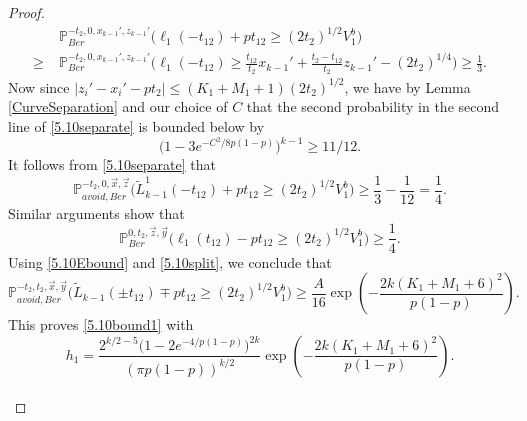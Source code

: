 \begin{proof}
\begin{equation}
\begin{split}
	&\mathbb{P}^{-t_2,0,x_{k-1}',z_{k-1}'}_{Ber}\Big(\ell_1(-t_{12}) + pt_{12} \geq (2t_2)^{1/2}V_1^b\Big)\\
	\geq \; & \mathbb{P}^{-t_2,0,x_{k-1}',z_{k-1}'}_{Ber}\Big(\ell_1(-t_{12}) \geq \frac{t_{12}}{t_2}x_{k-1}' + \frac{t_2-t_{12}}{t_2}z_{k-1}' - (2t_2)^{1/4}\Big) \geq \frac{1}{3}.
	\end{split}
	\end{equation}
	Now since $|z_i'-x_i'-pt_2| \leq (K_1+M_1+1)(2t_2)^{1/2}$, we have by Lemma \ref{CurveSeparation} and our choice of $C$ that the second probability in the second line of \eqref{5.10separate} is bounded below by
	\[
	\big(1-3e^{-C^2/8p(1-p)}\big)^{k-1} \geq 11/12.
	\]
	It follows from \eqref{5.10separate} that
	\begin{equation}\label{5.10left}
	\mathbb{P}^{-t_2,0,\vec{x},\vec{z}}_{avoid,Ber}\Big(\tilde{L}^1_{k-1}(-t_{12}) + pt_{12} \geq (2t_2)^{1/2}V_1^b\Big) \geq \frac{1}{3} - \frac{1}{12} = \frac{1}{4}.
	\end{equation}
	Similar arguments show that
	\begin{equation}\label{5.10right}
	\mathbb{P}^{0,t_2,\vec{z},\vec{y}}_{Ber}\Big(\ell_1(t_{12}) - pt_{12} \geq (2t_2)^{1/2}V_1^b\Big) \geq \frac{1}{4}.
	\end{equation}
	Using \eqref{5.10Ebound} and \eqref{5.10split}, we conclude that
	\[
	\mathbb{P}^{-t_2,t_2,\vec{x},\vec{y}}_{avoid, Ber}\Big(\tilde{L}_{k-1}(\pm t_{12}) \mp pt_{12} \geq (2t_2)^{1/2}V_1^b\Big) \geq \frac{A}{16}\exp\left(-\frac{2k(K_1+M_1+6)^2}{p(1-p)}\right).
	\]
	This proves \eqref{5.10bound1} with
	\[
	h_1 = \frac{2^{k/2-5}\big(1-2e^{-4/p(1-p)}\big)^{2k}}{(\pi p(1-p))^{k/2}}\exp\left(-\frac{2k(K_1+M_1+6)^2}{p(1-p)}\right).
	\]\\
	

\end{proof}

